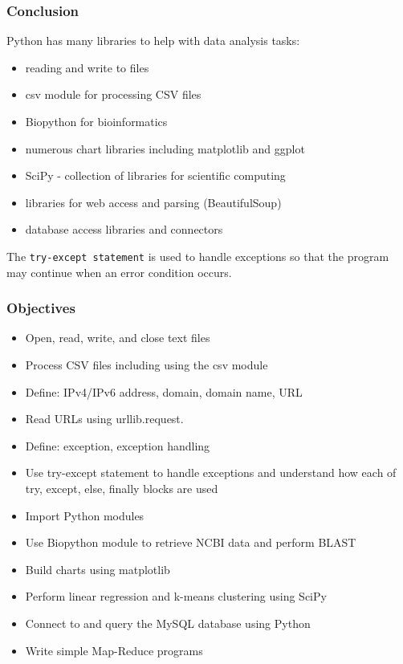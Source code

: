 \documentclass[xcolor=svgnames, handout]{beamer}
\newcommand{\ft}[1]{\frametitle{#1}}
\begin{document}
\begin{frame}[fragile]\ft{Conclusion }
Python has many libraries to help with data analysis tasks:

\begin{itemize}
\item reading and write to files
\item csv module for processing CSV files
\item Biopython for bioinformatics
\item numerous chart libraries including matplotlib and ggplot
\item SciPy - collection of libraries for scientific computing
\item libraries for web access and parsing (BeautifulSoup)
\item database access libraries and connectors
\end{itemize}
The {\tt try-except statement} is used to handle exceptions so that the program may continue when an error condition occurs.

\end{frame}

\begin{frame}\ft{Objectives}
\begin{itemize}
\item Open, read, write, and close text files
\item Process CSV files including using the csv module
\item Define: IPv4/IPv6 address, domain, domain name, URL
\item Read URLs using urllib.request.
\item Define: exception, exception handling
\item Use try-except statement to handle exceptions and understand how each of try, except, else, finally blocks are used
\item Import Python modules
\item Use Biopython module to retrieve NCBI data and perform BLAST
\item Build charts using matplotlib
\item Perform linear regression and k-means clustering using SciPy
\item Connect to and query the MySQL database using Python
\item Write simple Map-Reduce programs

\end{itemize}

\end{frame}
\end{document}
